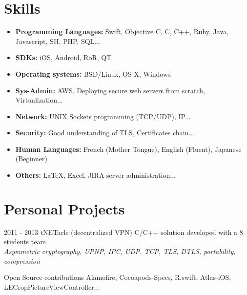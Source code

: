 \documentclass[]{template/friggeri-cv} %
\begin{document}

\section{Skills}

\begin{itemize}
\item \textbf{Programming Languages:} Swift, Objective C, C, C++, Ruby, Java, Javascript, SH, PHP, SQL...
\item \textbf{SDKs:} iOS, Android, RoR, QT
\item \textbf{Operating systems:} BSD/Linux, OS X, Windows
\item \textbf{Sys-Admin:} AWS, Deploying secure web servers from scratch, Virtualization...
\item \textbf{Network:} UNIX Sockets programming (TCP/UDP), IP...
\item \textbf{Security:} Good understanding of TLS, Certificates chain...
\item \textbf{Human Languages:} French (Mother Tongue), English (Fluent), Japanese (Beginner)
\item \textbf{Others:} \LaTeX, Excel, JIRA-server administration...
\end{itemize}


\section{Personal Projects}
\begin{entrylist}
  \entry
      {2011 - 2013}
      {tNETacle (decentralized VPN)}
      {}
      {C/C++ solution developed with a 8 students team \\
      \emph{Asymmetric cryptography, UPNP, IPC, UDP, TCP, TLS, DTLS, portability, compression}}

\entry
{}
{Open Source contributions}
{}
{Alamofire, Cocoapods-Specs, R.swift, Atlas-iOS, LECropPictureViewController...}


\end{entrylist}
\end{document}

